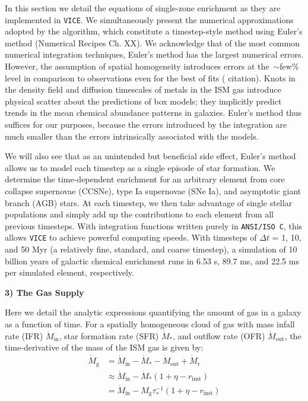 \documentclass{report}
\begin{document}
In this section we detail the equations of single-zone enrichment as they are 
implemented in \texttt{VICE}. We simultaneously present the numerical 
approximations adopted by the algorithm, which constitute a timestep-style 
method using Euler's method (Numerical Recipes Ch. XX). We acknowledge that of 
the most common numerical integration techniques, Euler's method has the 
largest numerical errors. However, the assumption of spatial homogeneity 
introduces errors at the~$\sim$few\% level in comparison to observations even 
for the best of fits ({\color{red} citation}). Knots in the density field and 
diffusion timescales of metals in the ISM gas introduce physical scatter about 
the predictions of box models; they implicitly predict trends in the 
mean chemical abundance patterns in galaxies. Euler's method thus suffices 
for our purposes, because the errors introduced by the integration are much 
smaller than the errors intrinsically associated with the models. 
\par
We will also see that as an unintended but beneficial side effect, Euler's 
method allows us to model 
each timestep as a single episode of star formation. We determine the 
time-dependent enrichment for an arbitrary element from core collapse 
supernovae (CCSNe), type Ia supernovae (SNe Ia), and asymptotic giant branch 
(AGB) stars. At each timestep, we then take advantage of single stellar 
populations and simply add up the contributions to each element from all 
previous timesteps. With integration functions written purely in 
\texttt{ANSI/ISO C}, this allows \texttt{VICE} to achieve powerful computing 
speeds. With timesteps of $\Delta t$ = 1, 10, and 50 Myr (a relatively fine, 
standard, and coarse timestep), a simulation of 10 billion years of galactic 
chemical enrichment runs in 6.53 s, 89.7 ms, and 22.5 ms per simulated 
element, respectively. 
\par\null\par
\noindent
\hypertarget{sec:gas_supply}{\textbf{3) The Gas Supply}} \par\noindent
Here we detail the analytic expressions quantifying the amount of gas in a 
galaxy as a function of time. For a spatially homogeneous cloud of gas with 
mass infall rate (IFR) $\dot{M}_\text{in}$, star formation rate (SFR) 
$\dot{M}_*$, and outflow rate (OFR) $\dot{M}_\text{out}$, the time-derivative 
of the mass of the ISM gas is given by: 
\begin{subequations}\begin{align}
\label{eq:mg_dot}
\dot{M}_\text{g} &= \dot{M}_\text{in} - \dot{M}_* - \dot{M}_\text{out} + 
\dot{M}_\text{r} \\ 
&\approx \dot{M}_\text{in} - \dot{M}_*(1 + \eta - r_\text{inst}) \\ 
&= \dot{M}_\text{in} - M_\text{g}\tau_*^{-1}(1 + \eta - r_\text{inst})
\end{align}\end{subequations}
\end{document}
